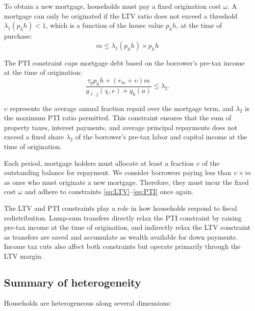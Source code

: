 \documentclass[parskip=full]{article}
\begin{document}
To obtain a new mortgage, households must pay a fixed origination cost $\omega$. A mortgage can only be originated if the LTV ratio does not exceed a threshold $\lambda_{1}(p_h h)<1$, which is a function of the house value $p_h h$, at the time of purchase:
\begin{equation}\label{eq:LTV}
m \leq \lambda_{1}(p_h h) \times p_h h
\end{equation}

\noindent The PTI constraint caps mortgage debt based on the borrower's pre-tax income at the time of origination: 
\begin{equation}\label{eq:PTI}
\frac{\tau_{p}p_h h+(r_{m}+\upsilon)m}{y_{\ell,j}(\chi,e)+y_{k}(a)} \leq \lambda_{2}.
\end{equation}

\noindent $\upsilon$ represents the average annual fraction repaid over the mortgage term, and $\lambda_{2}$ is the maximum PTI ratio permitted. This constraint ensures that the sum of property taxes, interest payments, and average principal repayments does not exceed a fixed share $\lambda_{2}$ of the borrower's pre-tax labor and capital income at the time of origination.

Each period, mortgage holders must allocate at least a fraction $\upsilon$ of the outstanding balance for repayment. We consider borrowers paying less than $\upsilon \times m$ as ones who must originate a new mortgage. Therefore, they must incur the fixed cost $\omega$ and adhere to constraints \eqref{eq:LTV}--\eqref{eq:PTI} once again.

The LTV and PTI constraints play a role in how households respond to fiscal redistribution. Lump-sum transfers directly relax the PTI constraint by raising pre-tax income at the time of origination, and indirectly relax the LTV constraint as transfers are saved and accumulate as wealth available for down payments. Income tax cuts also affect both constraints but operate primarily through the LTV margin.

\subsection{Summary of heterogeneity}

Households are heterogeneous along several dimensions:
\end{document}
